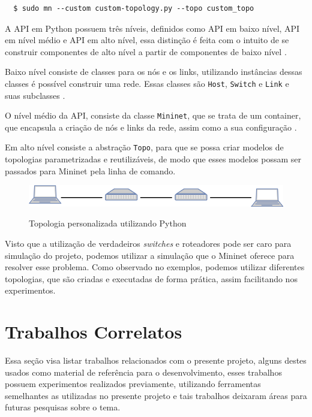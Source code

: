 \documentclass[
    12pt,
    openright, 
    oneside,
    a4paper,
    french,
    english,
    brazil
    ]{facom-ufu-abntex2}
\theoremstyle{definition}
\begin{document}
\begin{verbatim}
  $ sudo mn --custom custom-topology.py --topo custom_topo
\end{verbatim}

A API em Python possuem três níveis, definidos como API em baixo nível, API em nível médio e API
em alto nível, essa distinção é feita com o intuito de se construir componentes de alto nível
a partir de componentes de baixo nível \cite{mininetDocs}.

Baixo nível consiste de classes para os nós e os links, utilizando instâncias dessas 
classes é possível construir uma rede. Essas classes são \texttt{Host}, \texttt{Switch} e
\texttt{Link} e suas subclasses \cite{mininetDocs}.

O nível médio da API, consiste da classe \texttt{Mininet}, que se trata de um container,
que encapsula a criação de nós e links da rede, assim como a sua configuração \cite{mininetDocs}.

Em alto nível consiste a abstração \texttt{Topo}, para que se possa criar modelos de topologias 
parametrizadas e reutilizáveis, de modo que esses modelos possam ser passados para Mininet
pela linha de comando.

\begin{figure}[ht]
    \caption{Topologia personalizada utilizando Python}
    \centering
    \includegraphics[width=\textwidth]{images/2sw-2host.png}
    \label{fig:custom-topology-example}
\end{figure}

Visto que a utilização de verdadeiros \emph{switches} e roteadores pode ser caro para simulação do
projeto, podemos utilizar a simulação que o Mininet oferece para resolver esse problema.
Como observado no exemplos, podemos utilizar diferentes topologias, que são criadas e 
executadas de forma prática, assim facilitando nos experimentos.

\section{Trabalhos Correlatos}
Essa seção visa listar trabalhos relacionados com o presente projeto, alguns destes usados
como material de referência para o desenvolvimento, esses trabalhos possuem experimentos
realizados previamente, utilizando ferramentas semelhantes as utilizadas no presente projeto 
e tais trabalhos deixaram áreas para futuras pesquisas sobre o tema.
\end{document}
